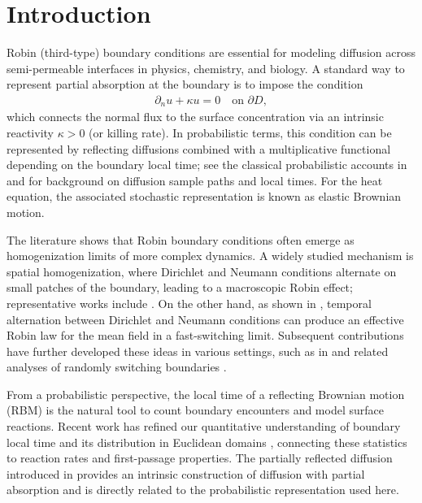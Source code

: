\documentclass[11pt]{amsart}
\theoremstyle{plain}
\theoremstyle{definition}
\theoremstyle{remark}
\begin{document}
	\section{Introduction}
Robin (third-type) boundary conditions are essential for modeling diffusion across semi-permeable interfaces in physics, chemistry, and biology. A standard way to represent partial absorption at the boundary is to impose the condition
\begin{align}
	\label{robin:bc}
	\partial_n u + \kappa u = 0\quad\text{on }\partial D,
\end{align}
which connects the normal flux to the surface concentration via an intrinsic reactivity $\kappa >0$ (or killing rate). In probabilistic terms, this condition can be represented by reflecting diffusions combined with a multiplicative functional depending on the boundary local time; see the classical probabilistic accounts in \cite{Papanicolaou1990} and \cite{ItoMcKean1974} for background on diffusion sample paths and local times. For the heat equation, the associated stochastic representation is known as elastic Brownian motion.

The literature shows that Robin boundary conditions often emerge as homogenization limits of more complex dynamics. A widely studied mechanism is spatial homogenization, where Dirichlet and Neumann conditions alternate on small patches of the boundary, leading to a macroscopic Robin effect; representative works include \cite{Berezhkovskii2004, Berezhkovskii2006, FiloLuckhaus1995, FiloLuckhaus2000, Friedman1995}. On the other hand, as shown in \cite{LawleyKeener2015}, temporal alternation between Dirichlet and Neumann conditions can produce an effective Robin law for the mean field in a fast-switching limit. Subsequent contributions have further developed these ideas in various settings, such as in \cite{LawleyMattinglyReed2015, Lawley2016} and related analyses of randomly switching boundaries \cite{BressloffLawley2015}.

From a probabilistic perspective, the local time of a reflecting Brownian motion (RBM) is the natural tool to count boundary encounters and model surface reactions. Recent work has refined our quantitative understanding of boundary local time and its distribution in Euclidean domains \cite{Grebenkov2019, Grebenkov2024review}, connecting these statistics to reaction rates and first-passage properties. The partially reflected diffusion introduced in \cite{Singer2008} provides an intrinsic construction of diffusion with partial absorption and is directly related to the probabilistic representation used here.
\end{document}
